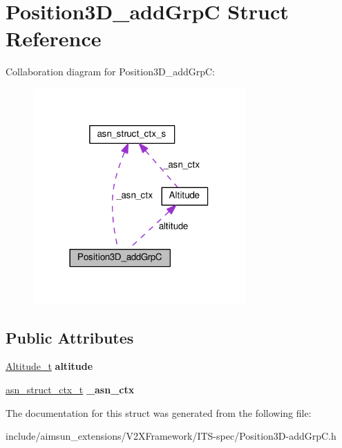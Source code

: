 \hypertarget{structPosition3D__addGrpC}{}\section{Position3\+D\+\_\+add\+GrpC Struct Reference}
\label{structPosition3D__addGrpC}


Collaboration diagram for Position3\+D\+\_\+add\+GrpC\+:\nopagebreak
\begin{figure}[H]
\begin{center}
\leavevmode
\includegraphics[width=230pt]{structPosition3D__addGrpC__coll__graph}
\end{center}
\end{figure}
\subsection*{Public Attributes}
\begin{DoxyCompactItemize}
\item 
\hyperlink{structAltitude}{Altitude\+\_\+t} {\bfseries altitude}\hypertarget{structPosition3D__addGrpC_a26ddaf1aced0e56a723cc409e4b976de}{}\label{structPosition3D__addGrpC_a26ddaf1aced0e56a723cc409e4b976de}

\item 
\hyperlink{structasn__struct__ctx__s}{asn\+\_\+struct\+\_\+ctx\+\_\+t} {\bfseries \+\_\+asn\+\_\+ctx}\hypertarget{structPosition3D__addGrpC_aa94497d128fa56a711b3141899b428b8}{}\label{structPosition3D__addGrpC_aa94497d128fa56a711b3141899b428b8}

\end{DoxyCompactItemize}


The documentation for this struct was generated from the following file\+:\begin{DoxyCompactItemize}
\item 
include/aimsun\+\_\+extensions/\+V2\+X\+Framework/\+I\+T\+S-\/spec/Position3\+D-\/add\+Grp\+C.\+h\end{DoxyCompactItemize}

